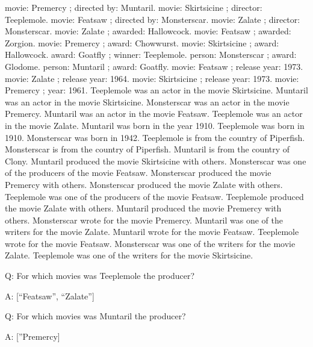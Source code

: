 \documentclass[
]{article}
\begin{document}
movie: Premercy ; directed by: Muntaril. movie: Skirtsicine ; director:
Teeplemole. movie: Featsaw ; directed by: Monsterscar. movie: Zalate ;
director: Monsterscar. movie: Zalate ; awarded: Hallowcock. movie:
Featsaw ; awarded: Zorgion. movie: Premercy ; award: Chowwurst. movie:
Skirtsicine ; award: Hallowcock. award: Goatfly ; winner: Teeplemole.
person: Monsterscar ; award: Glodome. person: Muntaril ; award: Goatfly.
movie: Featsaw ; release year: 1973. movie: Zalate ; release year: 1964.
movie: Skirtsicine ; release year: 1973. movie: Premercy ; year: 1961.
Teeplemole was an actor in the movie Skirtsicine. Muntaril was an actor
in the movie Skirtsicine. Monsterscar was an actor in the movie
Premercy. Muntaril was an actor in the movie Featsaw. Teeplemole was an
actor in the movie Zalate. Muntaril was born in the year 1910.
Teeplemole was born in 1910. Monsterscar was born in 1942. Teeplemole is
from the country of Piperfish. Monsterscar is from the country of
Piperfish. Muntaril is from the country of Clony. Muntaril produced the
movie Skirtsicine with others. Monsterscar was one of the producers of
the movie Featsaw. Monsterscar produced the movie Premercy with others.
Monsterscar produced the movie Zalate with others. Teeplemole was one of
the producers of the movie Featsaw. Teeplemole produced the movie Zalate
with others. Muntaril produced the movie Premercy with others.
Monsterscar wrote for the movie Premercy. Muntaril was one of the
writers for the movie Zalate. Muntaril wrote for the movie Featsaw.
Teeplemole wrote for the movie Featsaw. Monsterscar was one of the
writers for the movie Zalate. Teeplemole was one of the writers for the
movie Skirtsicine.

Q: For which movies was Teeplemole the producer?

A: {[}``Featsaw'', ``Zalate''{]}

Q: For which movies was Muntaril the producer?

A: {[}''Premercy{]}
\end{document}

